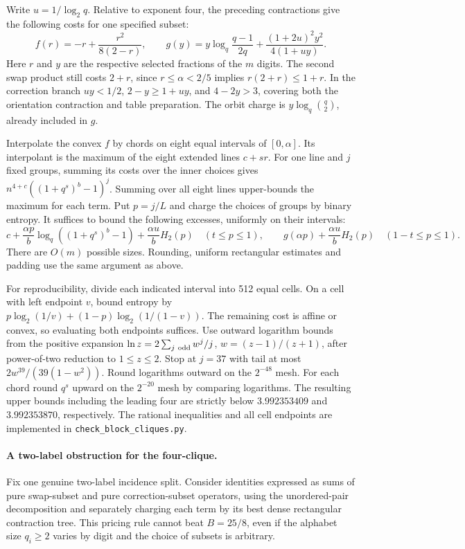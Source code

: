 \documentclass[11pt,letterpaper]{article}
\begin{document}
Write \(u=1/\log_2q\). Relative to exponent four, the preceding
contractions give the following costs for one specified subset:
\[
 f(r)=-r+\frac{r^2}{8(2-r)},\qquad
 g(y)=y\log_q\frac{q-1}{2q}+\frac{(1+2u)^2y^2}{4(1+uy)} .
\]
Here \(r\) and \(y\) are the respective selected fractions of the \(m\)
digits. The second swap product still costs \(2+r\), since
\(r\le\alpha<2/5\) implies \(r(2+r)\le 1+r\).
In the correction branch \(uy<1/2\), \(2-y\ge1+uy\), and
\(4-2y>3\), covering both the orientation contraction and table
preparation. The orbit charge is \(y\log_q\binom q2\), already included
in \(g\).

Interpolate the convex \(f\) by chords on eight equal intervals of
\([0,\alpha]\). Its interpolant is the maximum of the eight extended
lines \(c+sr\). For one line and \(j\) fixed groups, summing its costs
over the inner choices gives
\(n^{4+c}((1+q^s)^b-1)^j\).
Summing over all eight lines upper-bounds the maximum for each term.
Put \(p=j/L\) and charge the choices of groups by binary entropy.
It suffices to bound the following excesses, uniformly on their intervals:
\[
 c+\frac{\alpha p}{b}\log_q((1+q^s)^b-1)
       +\frac{\alpha u}{b}H_2(p)\quad(t\le p\le1),\qquad
 g(\alpha p)+\frac{\alpha u}{b}H_2(p)\quad(1-t\le p\le1).
\]
There are \(O(m)\) possible sizes. Rounding, uniform rectangular estimates
and padding use the same argument as above.

For reproducibility, divide each indicated interval into 512 equal cells.
On a cell with left endpoint \(v\), bound entropy by
\(p\log_2(1/v)+(1-p)\log_2(1/(1-v))\). The remaining cost is affine
or convex, so evaluating both endpoints suffices. Use outward logarithm
bounds from the positive expansion
\(\ln z=2\sum_{j\ {\rm odd}} w^j/j\), \(w=(z-1)/(z+1)\), after
power-of-two reduction to \(1\le z\le2\). Stop at \(j=37\) with tail at most
\(2w^{39}/(39(1-w^2))\). Round logarithms outward on the \(2^{-48}\)
mesh. For each chord round \(q^s\) upward on the \(2^{-20}\) mesh by
comparing logarithms. The resulting upper bounds including the leading four
are strictly below \(3.992353409\) and \(3.992353870\), respectively.
The rational inequalities and all cell endpoints are implemented in
\texttt{check\_block\_cliques.py}.

\paragraph{A two-label obstruction for the four-clique.}
Fix one genuine two-label incidence split. Consider identities expressed as
sums of pure swap-subset and pure correction-subset operators, using the
unordered-pair decomposition and separately charging each term by its best
dense rectangular contraction tree. This pricing rule cannot beat \(B=25/8\),
even if the alphabet size \(q_i\ge2\) varies by digit and the choice of
subsets is arbitrary.
\end{document}
